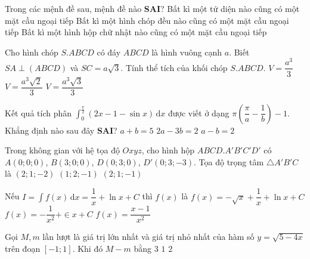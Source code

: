 \begin{ex}%
Trong các mệnh đề sau, mệnh đề nào \textbf{SAI}?
{Bất kì một tứ diện nào cũng có một mặt cầu ngoại tiếp}
{Bất kì một hình chóp đều nào cũng có một mặt cầu ngoại tiếp}
{Bất kì một hình hộp chữ nhật nào cũng có một mặt cầu ngoại tiếp}
\end{ex}

\begin{ex}%
Cho hình chóp $S.ABCD$ có đáy $ABCD$ là hình vuông cạnh $a$. Biết $SA\perp(ABCD)$ và $SC=a\sqrt{3}$. Tính thể tích của khối chóp $S.ABCD$.
{\True $V=\dfrac{a^3}{3}$}
{$V=\dfrac{a^3\sqrt{2}}{3}$}
{$V=\dfrac{a^3\sqrt{3}}{3}$}
\end{ex}

\begin{ex}%
Kết quả tích phân $\displaystyle\int_0^{\frac{\pi}{2}} \left(2x-1-\sin x\right)\mathrm{\, d}x$ được viết ở dạng $\pi\left(\dfrac{\pi}{a}-\dfrac{1}{b}\right)-1$. Khẳng định nào sau đây \textbf{SAI}?
{\True $a+b=5$}
{$2a-3b=2$}
{$a-b=2$}
\end{ex}

\begin{ex}%
Trong không gian với hệ tọa độ $Oxyz$, cho hình hộp $ABCD.A'B'C'D'$ có $A(0;0;0)$, $B(3;0;0)$, $D(0;3;0)$, $D'(0;3;-3)$. Tọa độ trọng tâm $\triangle A'B'C$ là
{\True $(2;1;-2)$}
{$(1;2;-1)$}
{$(2;1;-1)$}
\end{ex}

\begin{ex}%
Nếu $I=\displaystyle\int f(x)\mathrm{\, d}x=\dfrac{1}{x}+\ln x+C$ thì $f(x)$ là
{$f(x)=-\sqrt{x}+\dfrac{1}{x}+\ln x+C$}
{$f(x)=-\dfrac{1}{x^2}+\in x+C$}
{\True $f(x)=\dfrac{x-1}{x^2}$}
\end{ex}

\begin{ex}%
Gọi $M,m$ lần lượt là giá trị lớn nhất và giá trị nhỏ nhất của hàm số $y=\sqrt{5-4x}$ trên đoạn $[-1;1]$. Khi đó $M-m$ bằng
{$3$}
{$1$}
{\True $2$}
\end{ex}

